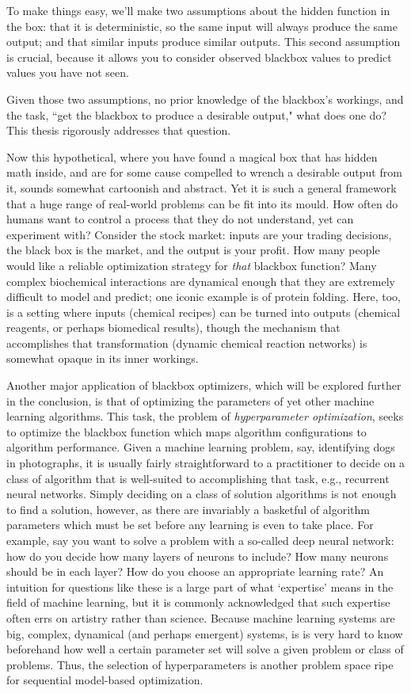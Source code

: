 To make things easy, we'll make two assumptions about the hidden function in the box: that it is deterministic, so the same input will always produce the same output; and that similar inputs produce similar outputs. This second assumption is crucial, because it allows you to consider observed blackbox values to predict values you have not seen.

Given those two assumptions, no prior knowledge of the blackbox's workings, and the task, ``get the blackbox to produce a desirable output," what does one do? This thesis rigorously addresses that question.

Now this hypothetical, where you have found a magical box that has hidden math inside, and are for some cause compelled to wrench a desirable output from it, sounds somewhat cartoonish and abstract. Yet it is such a general framework that a huge range of real-world problems can be fit into its mould. How often do humans want to control a process that they do not understand, yet can experiment with? Consider the stock market: inputs are your trading decisions, the black box is the market, and the output is your profit. How many people would like a reliable optimization strategy for \emph{that} blackbox function? Many complex biochemical interactions are dynamical enough that they are extremely difficult to model and predict; one iconic example is of protein folding. Here, too, is a setting where inputs (chemical recipes) can be turned into outputs (chemical reagents, or perhaps biomedical results), though the mechanism that accomplishes that transformation (dynamic chemical reaction networks) is somewhat opaque in its inner workings. 

Another major application of blackbox optimizers, which will be explored further in the conclusion, is that of optimizing the parameters of yet other machine learning algorithms. This task, the problem of \emph{hyperparameter optimization}, seeks to optimize the blackbox function which maps algorithm configurations to algorithm performance. Given a machine learning problem, say, identifying dogs in photographs, it is usually fairly straightforward to a practitioner to decide on a class of algorithm that is well-suited to accomplishing that task, e.g., recurrent neural networks. Simply deciding on a class of solution algorithms is not enough to find a solution, however, as there are invariably a basketful of algorithm parameters which must be set before any learning is even to take place. For example, say you want to solve a problem with a so-called deep neural network: how do you decide how many layers of neurons to include? How many neurons should be in each layer? How do you choose an appropriate learning rate? An intuition for questions like these is a large part of what `expertise' means in the field of machine learning, but it is commonly acknowledged that such expertise often errs on artistry rather than science. Because machine learning systems are big, complex, dynamical (and perhaps emergent) systems, is is very hard to know beforehand how well a certain parameter set will solve a given problem or class of problems. Thus, the selection of hyperparameters is another problem space ripe for sequential model-based optimization.

